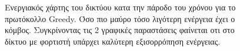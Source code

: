 \begin{figure}[H]
  \centering
  \caption{Ενεργιακός χάρτης του δικτύου κατα την πάροδο του χρόνου για το πρωτόκολλο Greedy. Όσο πιο μαύρο τόσο λιγότερη ενέργεια έχει ο κόμβος. Συγκρίνοντας τις 2
γραφικές παραστάσεις φαίνεται οτι στο δίκτυο με φορτιστή υπάρχει καλύτερη εξισορρόπηση ενέργειας.}
  \label{fig:5_1exp_4_1}
\end{figure}

